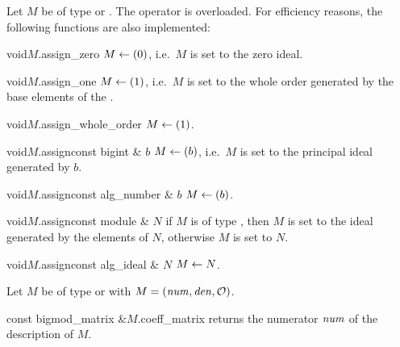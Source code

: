 
\ASGN

Let $M$ be of type  or .  The operator \code{=} is overloaded.  For
efficiency reasons, the following functions are also implemented:

\begin{fcode}{void}{$M$.assign_zero}{}
  $M \leftarrow (0)$, i.e.~$M$ is set to the zero ideal.
\end{fcode}

\begin{fcode}{void}{$M$.assign_one}{}
  $M \leftarrow (1)$, i.e.~$M$ is set to the whole order generated by the base elements of the
  .
\end{fcode}

\begin{fcode}{void}{$M$.assign_whole_order}{}
  $M \leftarrow (1)$.
\end{fcode}

\begin{fcode}{void}{$M$.assign}{const bigint & $b$}
  $M \leftarrow (b)$, i.e.~$M$ is set to the principal ideal generated by $b$.
\end{fcode}

\begin{fcode}{void}{$M$.assign}{const alg_number & $b$}
  $M \leftarrow (b)$.
\end{fcode}

\begin{fcode}{void}{$M$.assign}{const module & $N$}
  if $M$ is of type , then $M$ is set to the ideal generated by the elements of
  $N$, otherwise $M$ is set to $N$.
\end{fcode}

\begin{fcode}{void}{$M$.assign}{const alg_ideal & $N$}
  $M \leftarrow N$.
\end{fcode}



\ACCS

Let $M$ be of type  or  with $M = (\mathit{num}, \mathit{den}, \mathcal{O})$.

\begin{cfcode}{const bigmod_matrix &}{$M$.coeff_matrix}{}
  returns the numerator $\mathit{num}$ of the description of $M$.
\end{cfcode}

